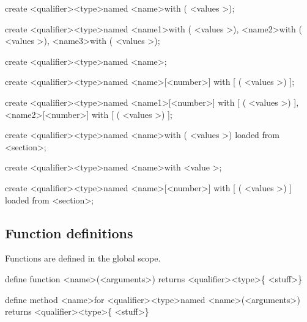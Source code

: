 \documentclass[12pt]{article}
\begin{document}
create \textless qualifier\textgreater  \space \textless type\textgreater \space named \textless name\textgreater with ( \textless values \textgreater );

create \textless qualifier\textgreater  \space \textless type\textgreater \space named \textless name1\textgreater \space  with ( \textless values \textgreater ), \textless name2\textgreater \space  with ( \textless values \textgreater ), \textless name3\textgreater \space  with ( \textless values \textgreater );

create \textless qualifier\textgreater \space \textless type\textgreater \space [ ] named \textless name\textgreater;

create \textless qualifier\textgreater \space \textless type\textgreater \space [ ] named \textless name\textgreater [\textless number\textgreater] with [ ( \textless values \textgreater ) ];

create \textless qualifier\textgreater \space \textless type\textgreater \space [ ] named \textless name1\textgreater [\textless number\textgreater] with [ ( \textless values \textgreater ) ], \textless name2\textgreater [\textless number\textgreater] with [ ( \textless values \textgreater ) ];

create \textless qualifier\textgreater  \space \textless type\textgreater \space named \textless name\textgreater with ( \textless values \textgreater ) loaded from \textless section\textgreater;

create \textless qualifier\textgreater  \space \textless type\textgreater \space named \textless name\textgreater with \textless value \textgreater;

create \textless qualifier\textgreater \space \textless type\textgreater \space [ ] named \textless name\textgreater [\textless number\textgreater] with [ ( \textless values \textgreater ) ] loaded from \textless section\textgreater;

\subsection {Function definitions}
Functions are defined in the global scope.

define function \textless name\textgreater (\textless arguments\textgreater) returns \textless qualifier\textgreater \space \textless type\textgreater \{ \textless stuff\textgreater \}

define method \textless name\textgreater \space for \textless qualifier\textgreater  \space \textless type\textgreater \space named  \textless name\textgreater \space  (\textless arguments\textgreater) returns \textless qualifier\textgreater \space \textless type\textgreater \{ \textless stuff\textgreater \}
\end{document}

